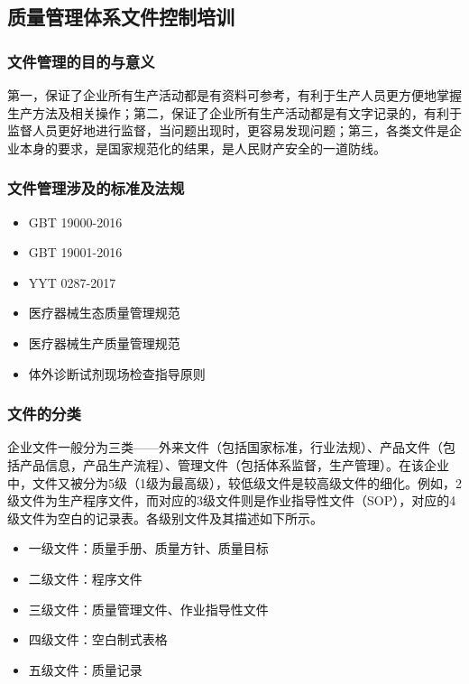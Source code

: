 \subsection{质量管理体系文件控制培训}

\subsubsection{文件管理的目的与意义} 第一，保证了企业所有生产活动都是有资料可参考，有利于生产人员更方便地掌握生产方法及相关操作；第二，保证了企业所有生产活动都是有文字记录的，有利于监督人员更好地进行监督，当问题出现时，更容易发现问题；第三，各类文件是企业本身的要求，是国家规范化的结果，是人民财产安全的一道防线。

\subsubsection{文件管理涉及的标准及法规}
\begin{itemize}
    \item GBT 19000-2016
    \item GBT 19001-2016
    \item YYT 0287-2017
    \item 医疗器械生态质量管理规范
    \item 医疗器械生产质量管理规范
    \item 体外诊断试剂现场检查指导原则
\end{itemize}

\subsubsection{文件的分类} 企业文件一般分为三类——外来文件（包括国家标准，行业法规）、产品文件（包括产品信息，产品生产流程）、管理文件（包括体系监督，生产管理）。在该企业中，文件又被分为5级（1级为最高级），较低级文件是较高级文件的细化。例如，2级文件为生产程序文件，而对应的3级文件则是作业指导性文件（SOP），对应的4级文件为空白的记录表。各级别文件及其描述如下所示。

\begin{itemize}
    \item 一级文件：质量手册、质量方针、质量目标
    \item 二级文件：程序文件
    \item 三级文件：质量管理文件、作业指导性文件
    \item 四级文件：空白制式表格
    \item 五级文件：质量记录
\end{itemize}

